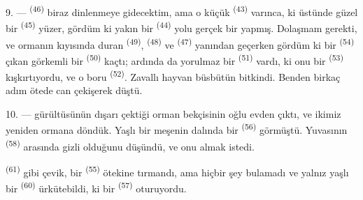 9. ---  \textsuperscript{(46)} biraz
dinlenmeye gidecektim, ama o küçük  \textsuperscript{(43)} varınca, ki üstünde
güzel
bir  \textsuperscript{(45)} yüzer, gördüm ki yakın bir
 \textsuperscript{(44)} yolu gerçek
bir  yapmış. Dolaşmam gerekti, ve ormanın kıyısında duran
 \textsuperscript{(49)}, 
\textsuperscript{(48)} ve  \textsuperscript{(47)}
yanından geçerken gördüm ki bir  \textsuperscript{(54)}
çıkan görkemli bir  \textsuperscript{(50)} kaçtı; ardında da
yorulmaz bir  \textsuperscript{(51)} vardı, ki onu bir
 \textsuperscript{(53)} kışkırtıyordu, ve o
boru  \textsuperscript{(52)}. Zavallı hayvan büsbütün
bitkindi. Benden
birkaç adım ötede can çekişerek düştü.

10. ---  gürültüsünün dışarı çektiği orman bekçisinin oğlu evden
çıktı, ve ikimiz yeniden ormana döndük. Yaşlı bir meşenin dalında bir
 \textsuperscript{(56)} görmüştü. Yuvasının
 \textsuperscript{(58)} arasında gizli olduğunu düşündü, ve
onu almak istedi.

 \textsuperscript{(61)} gibi çevik, bir 
\textsuperscript{(55)} ötekine tırmandı, ama hiçbir şey bulamadı ve yalnız yaşlı bir 
\textsuperscript{(60)} ürkütebildi, ki bir 
\textsuperscript{(57)} oturuyordu.
\VUsaut{4.0mm}
\VUfilet{22mm}
